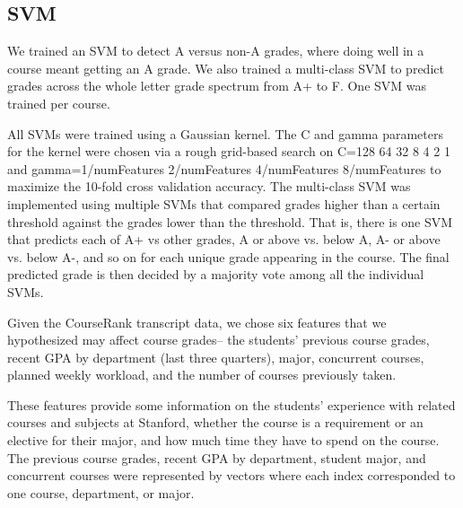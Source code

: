 \subsection{SVM}
We trained an SVM to detect A versus non-A grades, where doing well in a course meant getting an A grade.  We also trained a multi-class SVM to predict grades across the whole letter grade spectrum from A+ to F. One SVM was trained per course.

All SVMs were  trained using a Gaussian kernel. The C and gamma parameters for the kernel were chosen via a rough grid-based search on C={128 64 32 8 4 2 1} and gamma={1/numFeatures 2/numFeatures 4/numFeatures 8/numFeatures} to maximize the 10-fold cross validation accuracy. The multi-class SVM was implemented using multiple SVMs that compared grades higher than a certain threshold against the grades lower than the threshold. That is, there is one SVM that predicts each of  A+ vs other grades, A or above vs. below A, A- or above vs. below A-, and so on for each unique grade appearing in the course. The final predicted grade is then decided by a majority vote among all the individual SVMs.


Given the CourseRank transcript data, we chose six features that we hypothesized may affect course grades-- the students' previous course grades, recent GPA by department (last three quarters), major, concurrent courses, planned weekly workload, and the number of courses previously taken.

These features provide some information on the students' experience with related courses and subjects at Stanford, whether the course is a requirement or an elective for their major, and how much time they have to spend on the course. The previous course grades, recent GPA by department, student major, and concurrent courses were represented by vectors where each index corresponded to one course, department, or major.





